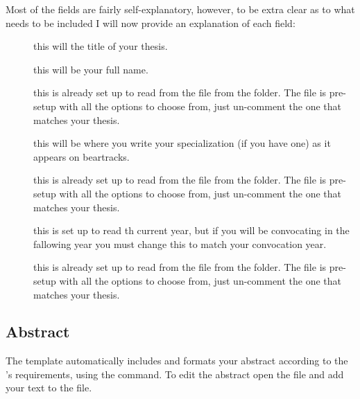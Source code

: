 			Most of the fields are fairly self-explanatory, however, to be extra clear as to what needs to be included I will now provide an explanation of each field:
			\begin{description}
				\item[] this will the title of your thesis.
				\item[] this will be your full name.
				\item[] this is already set up to read from the file  from the  folder. 
					The  file is pre-setup with all the options to choose from, just un-comment the one that matches your thesis.
				\item[] this will be where you write your specialization (if you have one) as it appears on beartracks.
				\item[] this is already set up to read from the file  from the  folder. 
					The  file is pre-setup with all the options to choose from, just un-comment the one that matches your thesis. 
				\item[] this is set up to read th current year, but if you will be convocating in the fallowing year you must change this to match your convocation year.
				\item[] this is already set up to read from the file  from the  folder.  
					The  file is pre-setup with all the options to choose from, just un-comment the one that matches your thesis.
			\end{description}


		\subsection{Abstract}\label{abstract}
			The template automatically includes and formats your abstract according to the \Faculty's requirements, using the  command.
			To edit the abstract open the file  and add your text to the file.

